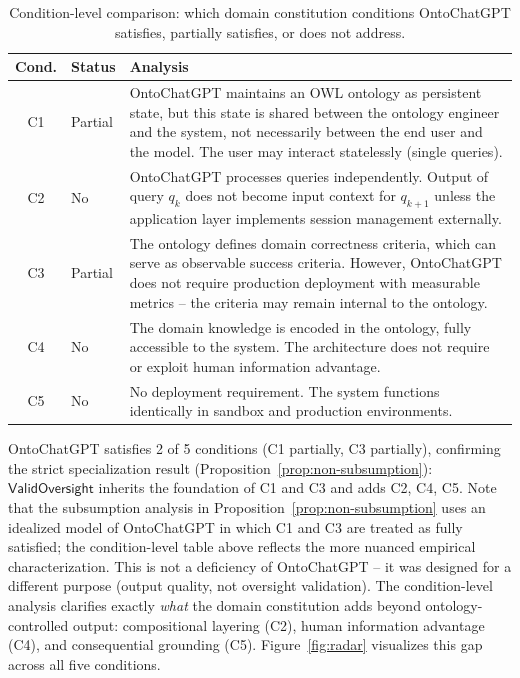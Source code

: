 \documentclass[11pt]{article}
\begin{document}
\begin{table}[h]
\centering
\caption{Condition-level comparison: which domain constitution conditions OntoChatGPT satisfies, partially satisfies, or does not address.}
\label{tab:condition-comparison}
\begin{tabular}{@{}clp{8cm}@{}}
\toprule
\textbf{Cond.} & \textbf{Status} & \textbf{Analysis} \\
\midrule
C1 & Partial & OntoChatGPT maintains an OWL ontology as persistent state, but this state is shared between the ontology engineer and the system, not necessarily between the end user and the model. The user may interact statelessly (single queries). \\
C2 & No & OntoChatGPT processes queries independently. Output of query $q_k$ does not become input context for $q_{k+1}$ unless the application layer implements session management externally. \\
C3 & Partial & The ontology defines domain correctness criteria, which can serve as observable success criteria. However, OntoChatGPT does not require production deployment with measurable metrics -- the criteria may remain internal to the ontology. \\
C4 & No & The domain knowledge is encoded in the ontology, fully accessible to the system. The architecture does not require or exploit human information advantage. \\
C5 & No & No deployment requirement. The system functions identically in sandbox and production environments. \\
\bottomrule
\end{tabular}
\end{table}

OntoChatGPT satisfies 2 of 5 conditions (C1 partially, C3 partially), confirming the strict specialization result (Proposition~\ref{prop:non-subsumption}): $\mathsf{ValidOversight}$ inherits the foundation of C1 and C3 and adds C2, C4, C5.
Note that the subsumption analysis in Proposition~\ref{prop:non-subsumption} uses an idealized model of OntoChatGPT in which C1 and C3 are treated as fully satisfied; the condition-level table above reflects the more nuanced empirical characterization.
This is not a deficiency of OntoChatGPT -- it was designed for a different purpose (output quality, not oversight validation).
The condition-level analysis clarifies exactly \emph{what} the domain constitution adds beyond ontology-controlled output: compositional layering (C2), human information advantage (C4), and consequential grounding (C5).
Figure~\ref{fig:radar} visualizes this gap across all five conditions.
\end{document}
